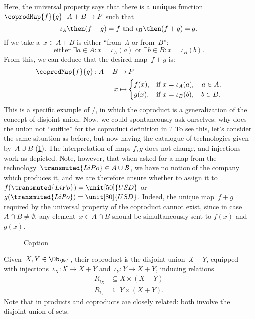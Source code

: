 \begin{example}
Here, the universal property says that there is a \textbf{unique} function~$\coprodMap{f}{g}\colon A+B\to P$ such that 
\begin{equation*}
    \iota_A\then (f+ g)=f \text{ and }\iota_B\then (f+ g)=g.
\end{equation*}
If we take a~$x\in A+B$ is either ``from~$A$ or from~$B$'':
\begin{equation*}
    \text{either } \exists a\in A:x=\iota_A(a) \text{ or }\exists b\in B:x=\iota_B(b).
\end{equation*}
From this, we can deduce that the desired map~$f+g$ is:
\begin{equation*}
\begin{aligned}
    \coprodMap{f}{g} \colon  A + B &\to P \\
    x &   \mapsto
    \begin{cases}
        f(x),& \text{if } x=\iota_A(a),\quad a \in A, \\
        g(x),& \text{if } x=\iota_B(b),\quad b \in B.
    \end{cases}
\end{aligned}
\end{equation*}
This is a specific example of \Set/\FinSet, in which the coproduct is a generalization of the concept of disjoint union. Now, we could spontaneously ask ourselves: why does the union not ``suffice'' for the coproduct definition in \Set? To see this, let's consider the same situation as before, but now having the catalogue of technologies given by~$A\cup B$ (\cref{fig:coprod_batteries_2}). The interpretation of maps $f,g$ does not change, and injections work as depicted. Note, however, that when asked for a map from the technology~$\transmuted{LiPo}\in A\cup B$, we have no notion of the company which produces it, and we are therefore unsure whether to assign it to~$f(\transmuted{LiPo})=\unit[50]{USD}$ or~$g(\transmuted{LiPo})=\unit[80]{USD}$. Indeed, the unique map~$f+g$ required by the universal property of the coproduct cannot exist, since in case $A\cap B\neq \emptyset$, any element~$x\in A\cap B$ should be simultaneously sent to $f(x)$ and $g(x)$.

\begin{figure}[h!]
    \centering
    \caption{Caption}
    \label{fig:coprod_batteries_2}
\end{figure}
\end{example}


\begin{example}
Given~$X,Y\in \Ob_\Rel$, their coproduct is the disjoint union~$X+Y$, equipped with injections~$\iota_X\colon X\to X+Y$ and~$\iota_Y\colon Y\to X+Y$, inducing relations
\begin{equation*}
\begin{aligned}
    R_{\iota_X}&\subseteq X\times (X+Y)\\
    R_{\iota_Y}&\subseteq Y\times (X+Y).
\end{aligned}
\end{equation*}
Note that in \Rel products and coproducts are closely related: both involve the disjoint union of sets.
\end{example}


